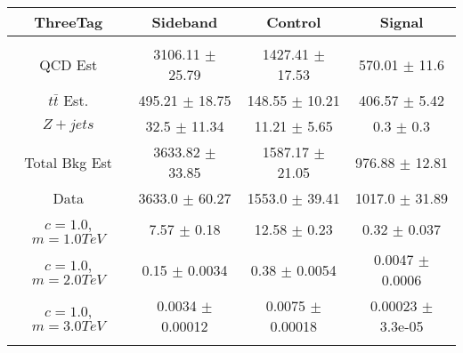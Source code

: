 \begin{footnotesize} 
\begin{tabular}{c|c|c|c} 
ThreeTag & Sideband & Control & Signal \\ 
\hline\hline 
& & & \\ 
QCD Est & 3106.11 $\pm$ 25.79 & 1427.41 $\pm$ 17.53 & 570.01 $\pm$ 11.6\\ 
$t\bar{t}$ Est.  & 495.21 $\pm$ 18.75 & 148.55 $\pm$ 10.21 & 406.57 $\pm$ 5.42\\ 
$Z+jets$ & 32.5 $\pm$ 11.34 & 11.21 $\pm$ 5.65 & 0.3 $\pm$ 0.3\\ 
Total Bkg Est & 3633.82 $\pm$ 33.85 & 1587.17 $\pm$ 21.05 & 976.88 $\pm$ 12.81\\ 
Data & 3633.0 $\pm$ 60.27 & 1553.0 $\pm$ 39.41 & 1017.0 $\pm$ 31.89\\ 
$c=1.0$,$m=1.0TeV$ & 7.57 $\pm$ 0.18 & 12.58 $\pm$ 0.23 & 0.32 $\pm$ 0.037\\ 
$c=1.0$,$m=2.0TeV$ & 0.15 $\pm$ 0.0034 & 0.38 $\pm$ 0.0054 & 0.0047 $\pm$ 0.0006\\ 
$c=1.0$,$m=3.0TeV$ & 0.0034 $\pm$ 0.00012 & 0.0075 $\pm$ 0.00018 & 0.00023 $\pm$ 3.3e-05\\ 
& & & \\ 
\hline\hline 
\end{tabular} 
\end{footnotesize} 
\newline 
